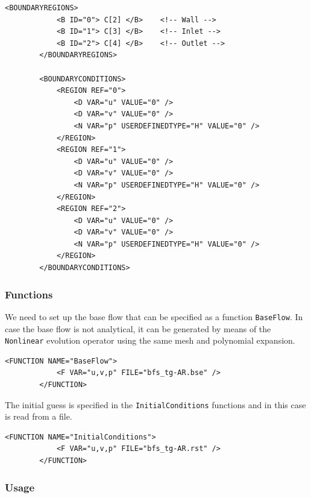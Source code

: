       \begin{lstlisting}[style=XMLStyle]
 <BOUNDARYREGIONS>
            <B ID="0"> C[2] </B>    <!-- Wall -->
            <B ID="1"> C[3] </B>    <!-- Inlet -->
            <B ID="2"> C[4] </B>    <!-- Outlet -->
        </BOUNDARYREGIONS>

        <BOUNDARYCONDITIONS>
            <REGION REF="0">
                <D VAR="u" VALUE="0" />
                <D VAR="v" VALUE="0" />
                <N VAR="p" USERDEFINEDTYPE="H" VALUE="0" />
            </REGION>
            <REGION REF="1">
                <D VAR="u" VALUE="0" />
                <D VAR="v" VALUE="0" />
                <N VAR="p" USERDEFINEDTYPE="H" VALUE="0" />
            </REGION>
            <REGION REF="2">
                <D VAR="u" VALUE="0" />
                <D VAR="v" VALUE="0" />
                <N VAR="p" USERDEFINEDTYPE="H" VALUE="0" />
            </REGION>
        </BOUNDARYCONDITIONS>
                                \end{lstlisting}

\subsubsection{Functions}

We need to set up the base flow that can be specified as a function \texttt{BaseFlow}. In case the base flow is not analytical, it can be generated by means of the \texttt{Nonlinear} evolution operator using the same mesh and polynomial expansion.

      \begin{lstlisting}[style=XMLStyle]
<FUNCTION NAME="BaseFlow">
            <F VAR="u,v,p" FILE="bfs_tg-AR.bse" />
        </FUNCTION>
                                        \end{lstlisting}


The initial guess is specified in the \texttt{InitialConditions} functions and in this case is read from a file.

 \begin{lstlisting}[style=XMLStyle]
<FUNCTION NAME="InitialConditions">
            <F VAR="u,v,p" FILE="bfs_tg-AR.rst" />
        </FUNCTION>
                                        \end{lstlisting}


\subsubsection{Usage}

